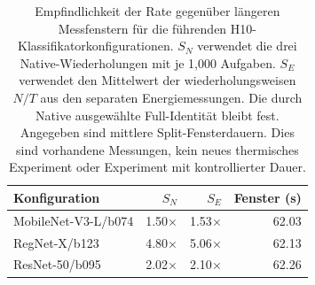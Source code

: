\begin{table}[t]
\centering\small
\setlength{\tabcolsep}{3pt}
\caption{Empfindlichkeit der Rate gegenüber längeren Messfenstern für die führenden H10-Klassifikatorkonfigurationen. $S_N$ verwendet die drei Native-Wiederholungen mit je 1,000 Aufgaben. $S_E$ verwendet den Mittelwert der wiederholungsweisen $N/T$ aus den separaten Energiemessungen. Die durch Native ausgewählte Full-Identität bleibt fest. Angegeben sind mittlere Split-Fensterdauern. Dies sind vorhandene Messungen, kein neues thermisches Experiment oder Experiment mit kontrollierter Dauer.}
\label{tab:long_window}
\begin{tabular}{lrrr}
\toprule
Konfiguration & $S_N$ & $S_E$ & Fenster (s)\\
\midrule
MobileNet-V3-L/b074 & 1.50$\times$ & 1.53$\times$ & 62.03\\
RegNet-X/b123 & 4.80$\times$ & 5.06$\times$ & 62.13\\
ResNet-50/b095 & 2.02$\times$ & 2.10$\times$ & 62.26\\
\bottomrule
\end{tabular}
\end{table}
